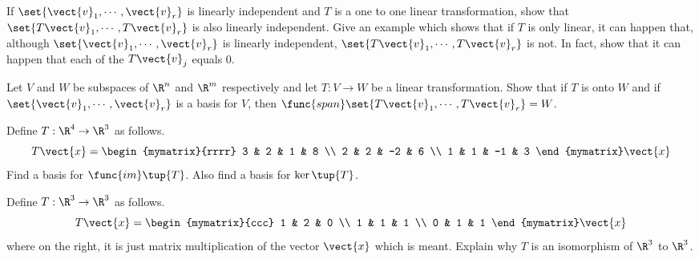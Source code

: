 \begin{enumialphparenastyle}
\begin{ex}
\begin{sol}
\end{sol}
\end{ex}


\begin{ex} If $\set{\vect{v}_{1},\cdots ,\vect{v}_{r}} $ is linearly
independent and $T$ is a one to one linear transformation, show that $
\set{T\vect{v}_{1},\cdots ,T\vect{v}_{r}} $ is also linearly
independent. Give an example which shows that if $T$ is only linear, it can
happen that, although $\set{\vect{v}_{1},\cdots ,\vect{v}_{r}} $ is
linearly independent, $\set{T\vect{v}_{1},\cdots ,T\vect{v}_{r}} $
is not. In fact, show that it can happen that each of the $T\vect{v}_{j}$
equals 0.
\end{ex}


\begin{ex} Let $V$ and $W$ be subspaces of $\R^{n}$ and $\R^{m}$
respectively and let $T:V\rightarrow W$ be a linear transformation. Show
that if $T$ is onto $W$ and if $\set{\vect{v}_{1},\cdots ,\vect{v}
_{r}} $ is a basis for $V$, then $\func{span}\set{T\vect{v}
_{1},\cdots ,T\vect{v}_{r}} =W$.
\end{ex}


\begin{ex} Define $T:\R^{4}\rightarrow \R^{3}$ as follows. 
\begin{equation*}
T\vect{x}=\begin{mymatrix}{rrrr}
3 & 2 & 1 & 8 \\ 
2 & 2 & -2 & 6 \\ 
1 & 1 & -1 & 3
\end{mymatrix} \vect{x}
\end{equation*}
Find a basis for $\func{im}\tup{T}$. Also find a basis for $\ker
\tup{T}$.
\end{ex}


\begin{ex} Define $T:\R^{3}\rightarrow \R^{3}$ as follows. 
\begin{equation*}
T\vect{x}=\begin{mymatrix}{ccc}
1 & 2 & 0 \\ 
1 & 1 & 1 \\ 
0 & 1 & 1
\end{mymatrix} \vect{x}
\end{equation*}
where on the right, it is just matrix multiplication of the vector $\vect{x}$
which is meant. Explain why $T$ is an isomorphism of $\R^{3}$ to $
\R^{3}$.
\end{ex}



\end{enumialphparenastyle}
